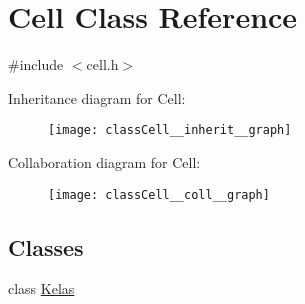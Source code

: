 \hypertarget{classCell}{}\section{Cell Class Reference}
\label{classCell}


{\ttfamily \#include $<$cell.\+h$>$}



Inheritance diagram for Cell\+:
\nopagebreak
\begin{figure}[H]
\begin{center}
\leavevmode
\texttt{[image: classCell\_\_inherit\_\_graph]}
\end{center}
\end{figure}


Collaboration diagram for Cell\+:
\nopagebreak
\begin{figure}[H]
\begin{center}
\leavevmode
\texttt{[image: classCell\_\_coll\_\_graph]}
\end{center}
\end{figure}
\subsection*{Classes}
\begin{DoxyCompactItemize}
\item 
class \hyperlink{classCell_1_1Kelas}{Kelas}
\end{DoxyCompactItemize}
